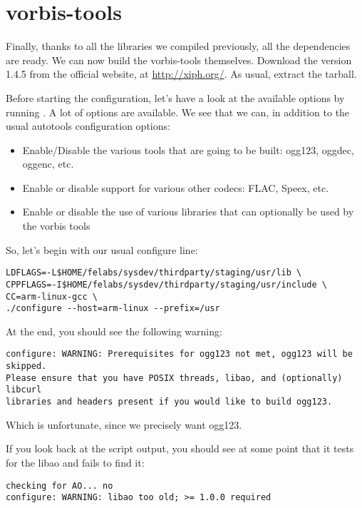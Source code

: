 \section{vorbis-tools}

Finally, thanks to all the libraries we compiled previously, all the
dependencies are ready. We can now build the vorbis-tools themselves.
Download the version 1.4.5 from the official website, at
\url{http://xiph.org/}. As usual, extract the tarball.

Before starting the configuration, let's have a look at the available
options by running . A lot of options are
available. We see that we can, in addition to the usual autotools
configuration options:

\begin{itemize}
\item Enable/Disable the various tools that are going to be built:
  ogg123, oggdec, oggenc, etc.
\item Enable or disable support for various other codecs: FLAC, Speex,
  etc.
\item Enable or disable the use of various libraries that can
  optionally be used by the vorbis tools
\end{itemize}

So, let's begin with our usual configure line:

\begin{verbatim}
LDFLAGS=-L$HOME/felabs/sysdev/thirdparty/staging/usr/lib \
CPPFLAGS=-I$HOME/felabs/sysdev/thirdparty/staging/usr/include \
CC=arm-linux-gcc \
./configure --host=arm-linux --prefix=/usr
\end{verbatim}

At the end, you should see the following warning:

\begin{verbatim}
configure: WARNING: Prerequisites for ogg123 not met, ogg123 will be skipped.
Please ensure that you have POSIX threads, libao, and (optionally) libcurl
libraries and headers present if you would like to build ogg123.
\end{verbatim}

Which is unfortunate, since we precisely want ogg123.

If you look back at the script output, you should see at some point
that it tests for the libao and fails to find it:

\begin{verbatim}
checking for AO... no
configure: WARNING: libao too old; >= 1.0.0 required
\end{verbatim}

